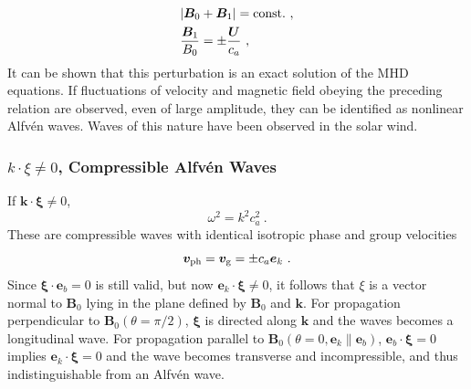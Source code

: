 \documentclass[12pt,a4paper]{article}
\renewcommand{\vec}[1]{\boldsymbol{#1}}
\begin{document}
\begin{align}
& |\vec{B}_0 +\vec{B}_1| = {\rm const.} ~, \\
& \dfrac{\vec{B}_1}{B_0} = \pm \dfrac{\vec{U}}{c_a} ~,
\end{align}
It can be shown that this perturbation is an exact solution of the MHD equations. If fluctuations of velocity and magnetic field obeying the preceding relation are observed, even of large amplitude, they can be identified as nonlinear Alfvén waves. Waves of this nature have been observed in the solar wind.

\subsubsection{$k \cdot \xi \neq 0$,  Compressible Alfv\'en Waves}
If $\vec{k} \cdot \vec{\xi} \neq 0$, 
\begin{equation}
\omega^2  = k^2 c_a^2 ~.
\end{equation}
These are compressible waves with identical isotropic phase and group velocities
\begin{equation}
\vec{v}_{\rm ph} = \vec{v}_{\rm g} = \pm  c_a \vec{e}_k ~.
\end{equation}
Since $\vec{\xi} \cdot \vec{e}_b =0$ is still valid, but now $\vec{e}_k \cdot \vec{\xi} \neq 0$, it follows that $\xi$ is a vector normal to $\vec{B}_0$ lying in the plane defined by $\vec{B}_0$ and $\vec{k}$. For propagation perpendicular to $\vec{B}_0 (\theta = \pi/2)$, $\vec{\xi}$ is directed along $\vec{k}$ and the waves becomes a longitudinal wave. For propagation parallel to $\vec{B}_0 (\theta = 0,  \vec{e}_k \parallel  \vec{e}_b)$,  $\vec{e}_b \cdot \vec{\xi} = 0$ implies $\vec{e}_k \cdot \vec{\xi} = 0$ and the wave becomes transverse and incompressible, and thus indistinguishable from an Alfvén wave.
\end{document}
